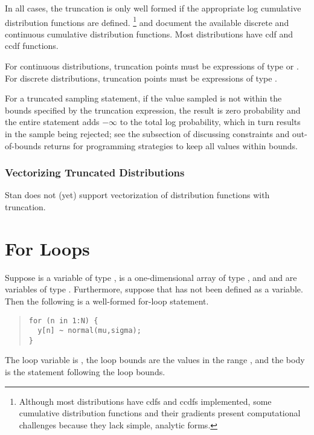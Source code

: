 In all cases, the truncation is only well formed if the
appropriate log cumulative distribution functions are defined.%
%
\footnote{Although most distributions have cdfs and ccdfs implemented,
  some cumulative distribution functions and their gradients present
  computational challenges because they lack simple, analytic forms.}
%
 and
 document the available discrete
and continuous cumulative distribution functions.  Most distributions
have cdf and ccdf functions.

For continuous distributions, truncation points must be expressions of
type  or .  For discrete distributions, truncation
points must be expressions of type .  

For a truncated sampling statement, if the value sampled is not within
the bounds specified by the truncation expression, the result is zero
probability and the entire statement adds $-\infty$ to the total log
probability, which in turn results in the sample being rejected; see
the subsection of  discussing constraints
and out-of-bounds returns for programming strategies to keep
all values within bounds.

\subsubsection{Vectorizing Truncated Distributions}

Stan does not (yet) support vectorization of distribution functions
with truncation.


\section{For Loops}

Suppose
 is a variable of type ,  is a
one-dimensional array of type , and  and
 are variables of type .  Furthermore, suppose
that  has not been defined as a variable. Then the following
is a well-formed for-loop statement.
%
\begin{quote}
\begin{Verbatim}
for (n in 1:N) {
  y[n] ~ normal(mu,sigma);
}
\end{Verbatim}
\end{quote}
%
The loop variable is , the loop bounds are the values in the
range , and the body is the statement following the
loop bounds.  

